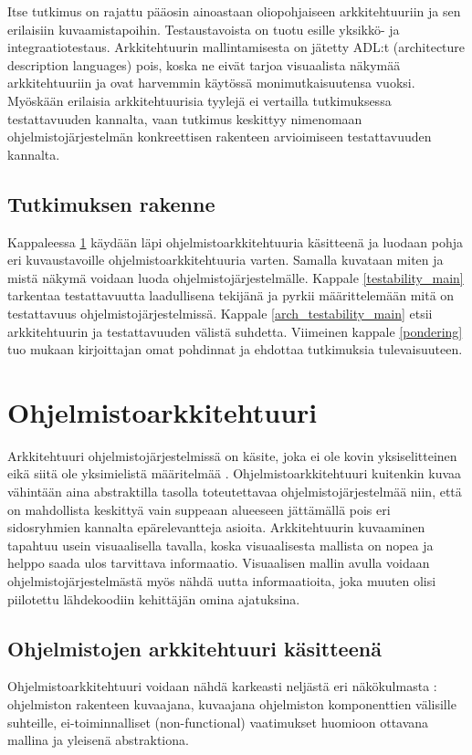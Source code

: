 \documentclass[finnish]{tktltiki2}
\numberwithin{table}{section}
\theoremstyle{definition}
\theoremstyle{remark}
\begin{document}
Itse tutkimus on rajattu pääosin ainoastaan oliopohjaiseen arkkitehtuuriin ja sen erilaisiin kuvaamistapoihin. Testaustavoista on tuotu esille yksikkö- ja integraatiotestaus. Arkkitehtuurin mallintamisesta on jätetty ADL:t (architecture description languages) pois, koska ne eivät tarjoa visuaalista näkymää arkkitehtuuriin ja ovat harvemmin käytössä monimutkaisuutensa vuoksi. Myöskään erilaisia arkkitehtuurisia tyylejä ei vertailla tutkimuksessa testattavuuden kannalta, vaan tutkimus keskittyy nimenomaan ohjelmistojärjestelmän konkreettisen rakenteen arvioimiseen testattavuuden kannalta.

\subsection{Tutkimuksen rakenne}

Kappaleessa \ref{software_architecture_main} käydään läpi ohjelmistoarkkitehtuuria käsitteenä ja luodaan pohja eri kuvaustavoille ohjelmistoarkkitehtuuria varten. Samalla kuvataan miten ja mistä näkymä voidaan luoda ohjelmistojärjestelmälle. Kappale \ref{testability_main} tarkentaa testattavuutta laadullisena tekijänä ja pyrkii määrittelemään mitä on testattavuus ohjelmistojärjestelmissä. Kappale \ref{arch_testability_main} etsii arkkitehtuurin ja testattavuuden välistä suhdetta. Viimeinen kappale \ref{pondering} tuo mukaan kirjoittajan omat pohdinnat ja ehdottaa tutkimuksia tulevaisuuteen. 


\section{Ohjelmistoarkkitehtuuri} \label{software_architecture_main}
Arkkitehtuuri ohjelmistojärjestelmissä on käsite, joka ei ole kovin yksiselitteinen eikä siitä ole yksimielistä määritelmää \citep[s. 363]{solms_what_2012}. 
Ohjelmistoarkkitehtuuri kuitenkin kuvaa vähintään aina abstraktilla tasolla toteutettavaa ohjelmistojärjestelmää niin, että on mahdollista keskittyä vain suppeaan alueeseen jättämällä pois eri sidosryhmien kannalta epärelevantteja asioita. Arkkitehtuurin kuvaaminen tapahtuu usein visuaalisella tavalla, koska visuaalisesta mallista on nopea ja helppo saada ulos tarvittava informaatio. Visuaalisen mallin avulla voidaan ohjelmistojärjestelmästä myös nähdä uutta informaatioita, joka muuten olisi piilotettu lähdekoodiin kehittäjän omina ajatuksina.   

\subsection{Ohjelmistojen arkkitehtuuri käsitteenä} \label{ark}
Ohjelmistoarkkitehtuuri voidaan nähdä karkeasti neljästä eri näkökulmasta  \citep[s. 2-7]{gorton_understanding_2011}:  ohjelmiston rakenteen kuvaajana, kuvaajana ohjelmiston komponenttien välisille suhteille, ei-toiminnalliset (non-functional) vaatimukset huomioon ottavana mallina ja yleisenä abstraktiona. 
\end{document}

